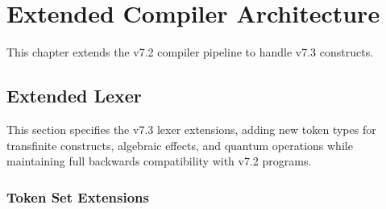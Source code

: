 \chapter{Extended Compiler Architecture}
\label{ch:extended-compiler}

\begin{tcolorbox}[colback=blue!5!white,colframe=blue!75!black,title=\vnewthree]
This chapter extends the v7.2 compiler pipeline to handle v7.3 constructs.
\end{tcolorbox}

\section{Extended Lexer}
\label{sec:extended-lexer}

This section specifies the v7.3 lexer extensions, adding new token types for transfinite constructs, algebraic effects, and quantum operations while maintaining full backwards compatibility with v7.2 programs.

\subsection{Token Set Extensions}
\label{subsec:token-extensions}


